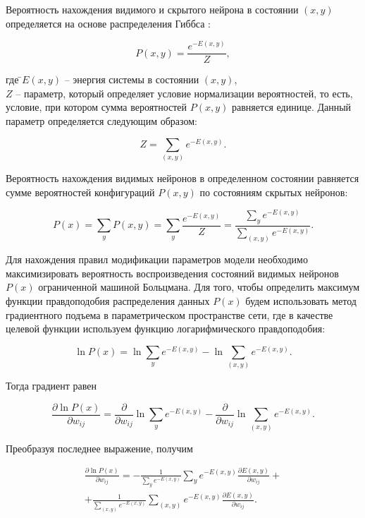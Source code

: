 Вероятность нахождения видимого и скрытого нейрона в состоянии $(x, y)$ определяется на основе распределения Гиббса \cite[c.~33]{gibbs1902}:
	
\begin{equation*}
	P(x, y)=\frac{e^{-E(x,y)}}{Z},
\end{equation*}
\begin{tabbing}	
где \=$E(x,y)$ -- энергия системы в состоянии $(x,y)$,\\
\>$Z$ -- параметр, который определяет условие нормализации вероятностей, то есть, условие, при котором сумма вероятностей $P(x, y)$ равняется единице. Данный параметр определяется следующим образом:
\end{tabbing}	

\begin{equation*}
	Z=\sum_{(x,y)} e^{-E(x,y)}.
\end{equation*}
	
Вероятность нахождения видимых нейронов в определенном состоянии равняется сумме вероятностей  конфигураций $P(x,y)$ по состояниям скрытых нейронов:
	
\begin{equation*}
	P(x)=\sum_y P(x,y)=\sum_y \frac{e^{-E(x,y)}}{Z}=\frac{\sum_y e^{-E(x,y)}}{\sum_{(x,y)} e^{-E(x,y)}}.
\end{equation*}
	
Для нахождения правил модификации параметров модели необходимо максимизировать вероятность воспроизведения состояний видимых нейронов $P(x)$ ограниченной машиной Больцмана. Для того, чтобы определить максимум функции правдоподобия распределения данных $P(x)$ будем использовать метод градиентного подъема в параметрическом пространстве сети, где в качестве целевой функции используем функцию логарифмического правдоподобия:
	
\begin{equation*}
	\ln P(x)=\ln \sum_y e^{-E(x,y)}-\ln \sum_{(x,y)} e^{-E(x,y)}.
\end{equation*}
	
Тогда градиент равен
	
\begin{equation*}
	\frac{\partial \ln P(x)}{\partial w_{ij}}=\frac{\partial}{\partial w_{ij}}\ln \sum_y e^{-E(x,y)}-\frac{\partial}{\partial w_{ij}}\ln\sum_{(x,y)} e^{-E(x,y)}.
\end{equation*}
	
Преобразуя последнее выражение, получим
	
\begin{multline*}
	\frac{\partial \ln P(x)}{\partial w_{ij}}=-\frac{1}{\sum_y e^{-E(x,y)}}\sum_y e^{-E(x,y)}\frac{\partial E(x,y)}{\partial w_{ij}}+\\+\frac{1}{\sum_{(x,y)} e^{-E(x,y)}}\sum_{(x,y)} e^{-E(x,y)}\frac{\partial E(x,y)}{\partial w_{ij}}.
\end{multline*}
	
